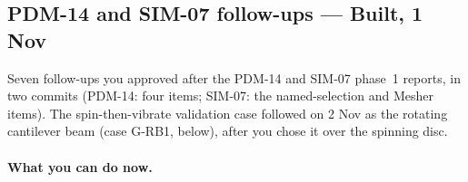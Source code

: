 \subsection{PDM-14 and SIM-07 follow-ups --- Built, 1 Nov}\label{sec:followups-built}

Seven follow-ups you approved after the PDM-14 and SIM-07 phase~1 reports, in two commits (PDM-14: four items;
SIM-07: the named-selection and Mesher items). The spin-then-vibrate validation case followed on 2 Nov as the
rotating cantilever beam (case G-RB1, below), after you chose it over the spinning disc.

\paragraph{What you can do now.}
